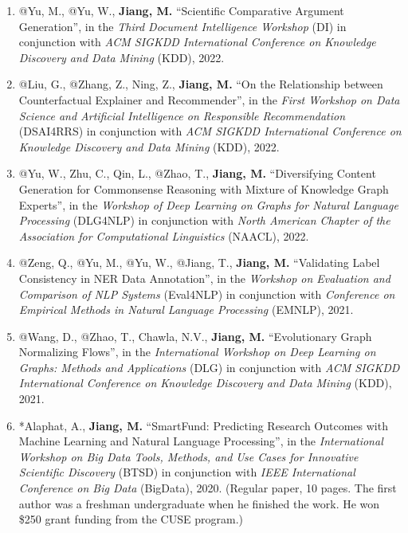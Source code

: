 \documentclass[10pt]{article}
\newenvironment{myindentpar}[1]%
{\begin{list}{}%
         {\setlength{\leftmargin}{#1}}%
         \item[]%
}
{\end{list}}
\newcounter{list}
\begin{document}
\begin{myindentpar}{0.00cm}
\begin{enumerate}[leftmargin=.5cm]
\item[W18] @Yu, M., @Yu, W., \textbf{Jiang, M.} ``Scientific Comparative Argument Generation'', in the \textit{Third Document Intelligence Workshop} (DI) in conjunction with \textit{ACM SIGKDD International Conference on Knowledge Discovery and Data Mining} (KDD), 2022.

\item[W17] @Liu, G., @Zhang, Z., Ning, Z., \textbf{Jiang, M.} ``On the Relationship between Counterfactual Explainer and Recommender'', in the \textit{First Workshop on Data Science and Artificial Intelligence on Responsible Recommendation} (DSAI4RRS) in conjunction with \textit{ACM SIGKDD International Conference on Knowledge Discovery and Data Mining} (KDD), 2022.

\item[W16] @Yu, W., Zhu, C., Qin, L., @Zhao, T., \textbf{Jiang, M.} ``Diversifying Content Generation for Commonsense Reasoning with Mixture of Knowledge Graph Experts'', in the \textit{Workshop of Deep Learning on Graphs for Natural Language Processing} (DLG4NLP) in conjunction with \textit{North American Chapter of the Association for Computational Linguistics} (NAACL), 2022.
		
\item[W15] @Zeng, Q., @Yu, M., @Yu, W., @Jiang, T., \textbf{Jiang, M.} ``Validating Label Consistency in NER Data Annotation'', in the \textit{Workshop on Evaluation and Comparison of NLP Systems} (Eval4NLP) in conjunction with \textit{Conference on Empirical Methods in Natural Language Processing} (EMNLP), 2021.

\item[W14] @Wang, D., @Zhao, T., Chawla, N.V., \textbf{Jiang, M.} ``Evolutionary Graph Normalizing Flows'', in the \textit{International Workshop on Deep Learning on Graphs: Methods and Applications} (DLG) in conjunction with \textit{ACM SIGKDD International Conference on Knowledge Discovery and Data Mining} (KDD), 2021.

\item[W13] *Alaphat, A., \textbf{Jiang, M.} ``SmartFund: Predicting Research Outcomes with Machine Learning and Natural Language Processing'', in the \textit{International Workshop on Big Data Tools, Methods, and Use Cases for Innovative Scientific Discovery} (BTSD) in conjunction with \textit{IEEE International Conference on Big Data} (BigData), 2020. (Regular paper, 10 pages. The first author was a freshman undergraduate when he finished the work. He won \$250 grant funding from the CUSE program.)


\end{enumerate}
\end{myindentpar}
\end{document}
